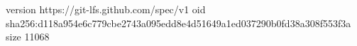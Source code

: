 version https://git-lfs.github.com/spec/v1
oid sha256:d118a954e6c779cbe2743a095edd8e4d51649a1ed037290b0fd38a308f553f3a
size 11068
